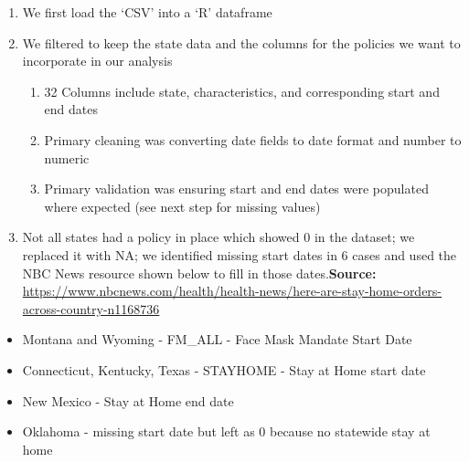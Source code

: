 \documentclass[
]{article}
\providecommand{\tightlist}{%
  \setlength{\itemsep}{0pt}\setlength{\parskip}{0pt}}
\begin{document}
\begin{enumerate}
\def\labelenumi{\arabic{enumi}.}
\item
  We first load the `CSV' into a `R' dataframe
\item
  We filtered to keep the state data and the columns for the policies we
  want to incorporate in our analysis

  \begin{enumerate}
  \def\labelenumii{\alph{enumii}.}
  \tightlist
  \item
    32 Columns include state, characteristics, and corresponding start
    and end dates
  \item
    Primary cleaning was converting date fields to date format and
    number to numeric
  \item
    Primary validation was ensuring start and end dates were populated
    where expected (see next step for missing values)
  \end{enumerate}
\item
  Not all states had a policy in place which showed 0 in the dataset; we
  replaced it with NA; we identified missing start dates in 6 cases and
  used the NBC News resource shown below to fill in those
  dates.\textbf{Source:}
  \url{https://www.nbcnews.com/health/health-news/here-are-stay-home-orders-across-country-n1168736}
\end{enumerate}

\begin{itemize}
\tightlist
\item
  Montana and Wyoming - FM\_ALL - Face Mask Mandate Start Date
\item
  Connecticut, Kentucky, Texas - STAYHOME - Stay at Home start date
\item
  New Mexico - Stay at Home end date
\item
  Oklahoma - missing start date but left as 0 because no statewide stay
  at home
\end{itemize}
\end{document}
